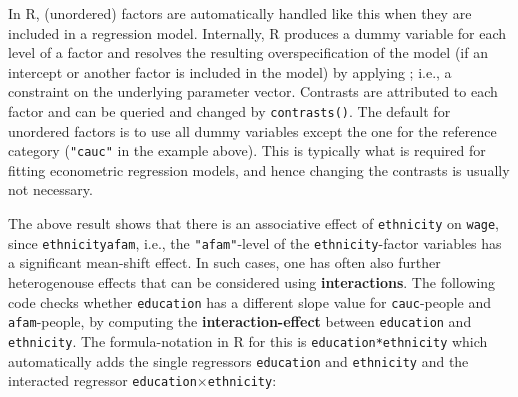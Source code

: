 \documentclass[
  14pt,
]{memoir}
\begin{document}
In \textsf{R}, (unordered) factors are automatically handled like this when they are included in a regression model. Internally, \textsf{R} produces a dummy variable for each level of a factor and resolves the resulting overspecification of the model (if an intercept or another factor is included in the model) by applying ; i.e., a constraint on the underlying parameter vector. Contrasts are attributed to each factor and can be queried and changed by \texttt{contrasts()}.
The default for unordered factors is to use all dummy variables except the one for the reference category (\texttt{"cauc"} in the example above). This is typically what is required for fitting econometric regression models, and hence changing the contrasts is usually not necessary.

The above result shows that there is an associative effect of \texttt{ethnicity} on \texttt{wage}, since \texttt{ethnicityafam}, i.e., the \texttt{"afam"}-level of the \texttt{ethnicity}-factor variables has a significant mean-shift effect. In such cases, one has often also further heterogenouse effects that can be considered using \textbf{interactions}. The following code checks whether \texttt{education} has a different slope value for \texttt{cauc}-people and \texttt{afam}-people, by computing the \textbf{interaction-effect} between \texttt{education} and \texttt{ethnicity}. The formula-notation in \textsf{R} for this is \texttt{education*ethnicity} which automatically adds the single regressors \texttt{education} and \texttt{ethnicity} and the interacted regressor \texttt{education}\(\times\)\texttt{ethnicity}:
\end{document}
